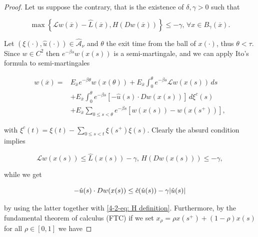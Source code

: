 \begin{theorem}
\begin{proof}
        Let us suppose the contrary, that is the existence of $\delta,\gamma>0$ such that

        \begin{equation}
            \max\left\{\mathcal{L}w(\overline{x}) - \hat{L}(\overline{x}), H(Dw(\overline{x}))\right\} \leq -\gamma, \,\forall x\in B_{\gamma}(\overline{x}).
        \end{equation}

        Let $(\xi(\cdot),\hat{u}(\cdot))\in\hat{\mathcal{A}}_{\nu}$ and $\theta$ the exit time from the ball of $x(\cdot)$, thus $\theta<\tau$. Since $w\in C^2$ then $e^{-\beta s}w(x(s))$ is a semi-martingale, and we can apply Ito's formula to semi-martingales

        \begin{equation}\label{4-2-eq: first w in proof viscosity}
            \begin{aligned}
                w(\overline{x}) = & E_{\overline{x}} e^{-\beta \theta}w(x(\theta)) + E_{\overline{x}}\int_0^{\theta} e^{-\beta s}\mathcal{L}w(x(s))\,ds \\
                & + E_{\overline{x}}\int_0^{\theta} e^{-\beta s}\left[-\hat{u}(s)\cdot Dw(x(s))\right]\,d\xi^c(s) \\
                & + E_{\overline{x}} \sum_{0\leq s <\theta} e^{-\beta s}\left[w(x(s)) - w(x(s^+))\right],
            \end{aligned}
        \end{equation}   

        with $\xi^c(t) = \xi(t) - \sum_{0\leq s <t} \xi(s^+)\xi(s)$. Clearly the absurd condition implies

        \begin{equation}\label{4-2-eq: mathcal L hat L}
            \mathcal{L}w(x(s))\leq\hat{L}(x(s)) - \gamma,\, H(Dw(x(s)))\leq -\gamma,
        \end{equation}

        while we get

        \begin{equation}\label{4-2-eq: h cdot Dw leq gamma}
            -\hat{u}(s)\cdot Dw(x(s)) \leq \hat{c}(\hat{u}(s)) - \gamma\abs{\hat{u}(s)}
        \end{equation}

        by using the latter together with \eqref{4-2-eq: H definition}. Furthermore, by the fundamental theorem of calculus (FTC) if we set $x_{\rho}=\rho x(s^+)+(1-\rho)x(s)$ for all $\rho\in[0,1]$ we have


\end{proof}
\end{theorem}
